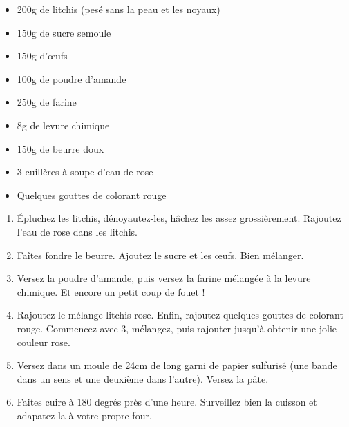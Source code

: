 \bigskip
{}
{}{\begin{itemize}
	\item 200g de litchis (pesé sans la peau et les noyaux)
	\item 150g de sucre semoule
	\item 150g d'\oe ufs
	\item 100g de poudre d'amande
	\item 250g de farine
	\item 8g de levure chimique
	\item 150g de beurre doux
	\item 3 cuillères à soupe d'eau de rose
	\item Quelques gouttes de colorant rouge
\end{itemize}

\bigskip}
{\begin{enumerate}
	\item Épluchez les litchis, dénoyautez-les, hâchez les assez grossièrement. Rajoutez l'eau de rose dans les litchis.
	\item Faîtes fondre le beurre. Ajoutez le sucre et les \oe ufs. Bien mélanger.
	\item Versez la poudre d'amande, puis versez la farine mélangée à la levure chimique. Et encore un petit coup de fouet !
	\item Rajoutez le mélange litchis-rose. Enfin, rajoutez quelques gouttes de colorant rouge. Commencez avec 3, mélangez, puis rajouter jusqu'à obtenir une jolie couleur rose.
	\item Versez dans un moule de 24cm de long garni de papier sulfurisé (une bande dans un sens et une deuxième dans l'autre). Versez la pâte.
	\item Faites cuire à 180 degrés près d'une heure. Surveillez bien la cuisson et adapatez-la à votre propre four.
\end{enumerate}}

